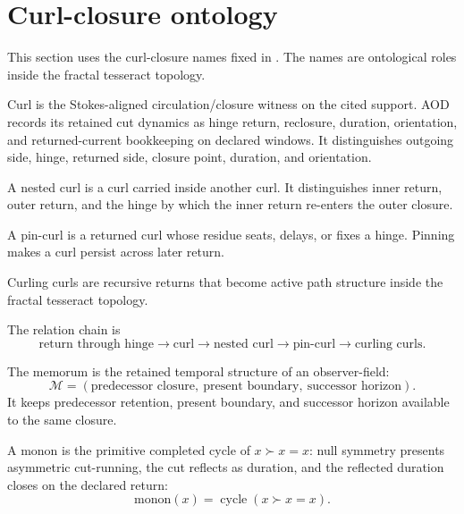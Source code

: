 \section{Curl-closure ontology}\label{sec:curl-closure-ontology}

This section uses the curl-closure names fixed in . The names are ontological roles inside the fractal tesseract topology.

\begin{definition}
Curl is the Stokes-aligned circulation/closure witness on the cited support. AOD records its retained cut dynamics as hinge return, reclosure, duration, orientation, and returned-current bookkeeping on declared windows. It distinguishes outgoing side, hinge, returned side, closure point, duration, and orientation.
\end{definition}

\begin{definition}
A nested curl is a curl carried inside another curl. It distinguishes inner return, outer return, and the hinge by which the inner return re-enters the outer closure.
\end{definition}

\begin{definition}
A pin-curl is a returned curl whose residue seats, delays, or fixes a hinge. Pinning makes a curl persist across later return.
\end{definition}

\begin{definition}
Curling curls are recursive returns that become active path structure inside the fractal tesseract topology.
\end{definition}

The relation chain is
\[
\text{return through hinge}\to \text{curl}\to \text{nested curl}\to \text{pin-curl}\to \text{curling curls}.
\]

\begin{definition}[Memorum]
The memorum is the retained temporal structure of an observer-field:
\[
\mathcal M=(\text{predecessor closure},\ \text{present boundary},\ \text{successor horizon}).
\]
It keeps predecessor retention, present boundary, and successor horizon available to the same closure.
\end{definition}

\begin{definition}
A monon is the primitive completed cycle of \(x\succ x=x\): null symmetry presents asymmetric cut-running, the cut reflects as duration, and the reflected duration closes on the declared return:
\[
\mathrm{monon}(x)=\operatorname{cycle}(x\succ x=x).
\]
\end{definition}

